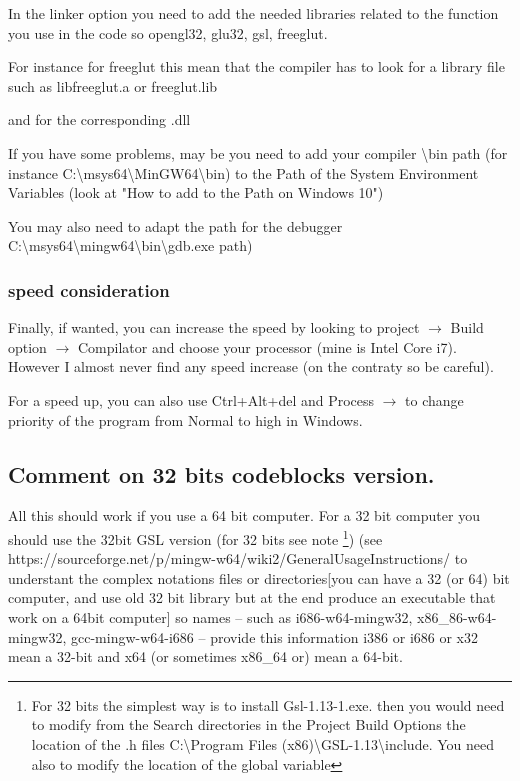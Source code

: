\documentclass[amsmath,amssymb,nofootinbib]{revtex4-2}
\begin{document}
In the linker option you need to add the needed libraries related to the function you use in the code so
opengl32,
glu32,
gsl, 
freeglut. 


For instance for freeglut this
mean that the compiler has to look for a library file such as libfreeglut.a or freeglut.lib

and for the corresponding .dll

If you have some problems, may be you need to add your compiler \textbackslash{}bin path (for instance C:\textbackslash{}msys64\textbackslash{}MinGW64\textbackslash{}bin)
 to the Path of the System Environment Variables (look at "How to add to the Path on Windows 10")

You may also need to adapt the path for the debugger C:\textbackslash{}msys64\textbackslash{}mingw64\textbackslash{}bin\textbackslash{}gdb.exe path) 


\subsubsection{speed consideration}
Finally, if wanted, you can increase the speed by looking to  project $\rightarrow$ Build option $\rightarrow$ Compilator and choose your processor  (mine is Intel Core i7). However I almost never find any speed increase (on the contraty so be careful).

For a speed up, you can also use Ctrl+Alt+del and Process $\rightarrow$ to change priority of the program from Normal to high in Windows.


\subsection{Comment on 32 bits codeblocks version.}
\label{32bits}

All this should work if you use a 64 bit computer. For a 32 bit computer you should use the 32bit GSL version (for 32 bits see note \footnote{For 32 bits the simplest way is to install Gsl-1.13-1.exe. then you would need to modify from the Search directories in the Project Build Options
	the location of the .h files
	C:\textbackslash{}Program Files (x86)\textbackslash{}GSL-1.13\textbackslash{}include. You need also to modify the location of the global variable}) (see
 https://sourceforge.net/p/mingw-w64/wiki2/GeneralUsageInstructions/ to understant
the complex notations files or directories[you can have a 32 (or 64) bit computer, and use old 32 bit library but at the end produce an executable that work on a 64bit computer]
so names -- such as i686-w64-mingw32, x86\_86-w64-mingw32, gcc-mingw-w64-i686 -- provide this information 
 i386 or i686 or x32 mean a 32-bit and  x64 (or sometimes x86\_64 or) mean a 64-bit.
\end{document}
